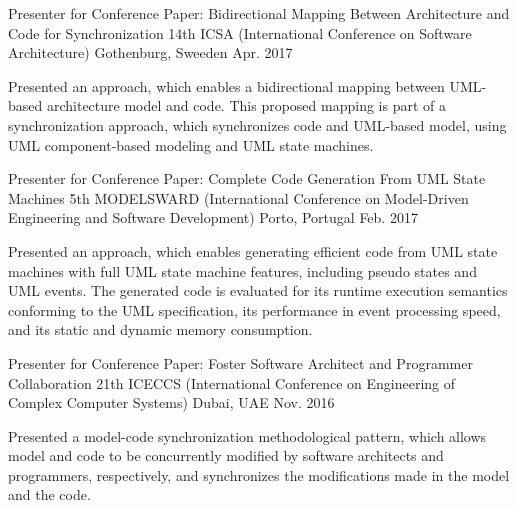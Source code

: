


\begin{cventries}


\cventry
{Presenter for Conference Paper: Bidirectional Mapping Between Architecture and Code for Synchronization} %
{14th ICSA (International Conference on Software Architecture)} %
{Gothenburg, Sweeden} %
{Apr. 2017} %
{ %
\begin{cvitems}
\item {Presented an approach, which enables a bidirectional mapping between UML-based architecture model and code. This proposed mapping is part of a synchronization approach, which synchronizes code and UML-based model, using UML component-based modeling and UML state machines.}
\end{cvitems}
}


\cventry
{Presenter for Conference Paper: Complete Code Generation From UML State Machines} %
{5th MODELSWARD (International Conference on Model-Driven Engineering and Software Development)} %
{Porto, Portugal} %
{Feb. 2017} %
{ %
	\begin{cvitems}
		\item {Presented an approach, which enables generating efficient code from UML state machines with full UML state machine features, including pseudo states and UML events. The generated code is evaluated for its runtime execution semantics conforming to the UML specification, its performance in event processing speed, and its static and dynamic memory consumption.}
	\end{cvitems}
}


\cventry
{Presenter for Conference Paper: Foster Software Architect and Programmer Collaboration} %
{21th ICECCS (International Conference on Engineering of Complex Computer Systems)} %
{Dubai, UAE} %
{Nov. 2016} %
{ %
	\begin{cvitems}
		\item {Presented a model-code synchronization methodological pattern, which allows model and code to be concurrently modified by software architects and programmers, respectively, and synchronizes the modifications made in the model and the code.}
	\end{cvitems}
}


\end{cventries}
